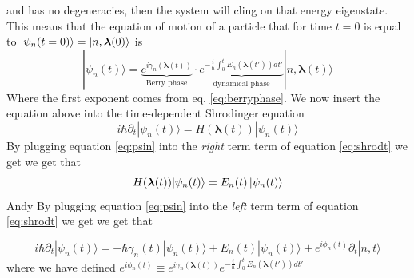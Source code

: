     and has no degeneracies, then the system will cling on that energy eigenstate.\newline
    This means that the equation of motion of a particle that for time $t=0$ is equal to $\ket{\psi_n(t=0)}=\ket{n,\boldsymbol \lambda(0)}$ is 
    \begin{equation}
        \label{eq:psin}
        |\psi_n(t)\rangle=\underbrace{e^{i\gamma_n(\boldsymbol \lambda (t))}}_{\textrm{Berry phase}}\cdot
        \underbrace{e^{-\frac i\hbar\int_0^t E_n(\boldsymbol \lambda (t')) dt'}}_\textrm{dynamical phase}|n,\boldsymbol \lambda (t)\rangle      
    \end{equation}
    Where the first exponent comes from eq. \ref{eq:berryphase}. We now insert the equation above into the time-dependent Shrodinger equation
    \begin{equation}
        \label{eq:shrodt}
        i\hbar\partial_t|\psi_n(t)\rangle=H(\boldsymbol \lambda(t)) |\psi_n(t)\rangle
    \end{equation}
    By plugging equation \ref{eq:psin} into the \textit{right} term term of equation \ref{eq:shrodt} we get we get that
    \begin{equation}
        \label{eq:H(t)}
        H(\boldsymbol \lambda(t)) |\psi_n(t)\rangle = E_n(t)\ket{\psi_n(t)}
    \end{equation}
    Andy By plugging equation \ref{eq:psin} into the \textit{left} term term of equation \ref{eq:shrodt} we get we get that

    \begin{equation}
        \label{eq:psin-t}
        i\hbar\partial_t|\psi_n(t)\rangle=
        -\hbar \dot \gamma_n(t)|\psi_n(t)\rangle + E_n(t)|\psi_n(t)\rangle + e^{i\phi_n(t)}\partial_t|n,t\rangle
    \end{equation}
    where we have defined $e^{i\phi_n(t)} \equiv e^{i\gamma_n(\boldsymbol \lambda (t))}e^{-\frac i\hbar\int_0^t E_n(\boldsymbol \lambda (t')) dt'}$

